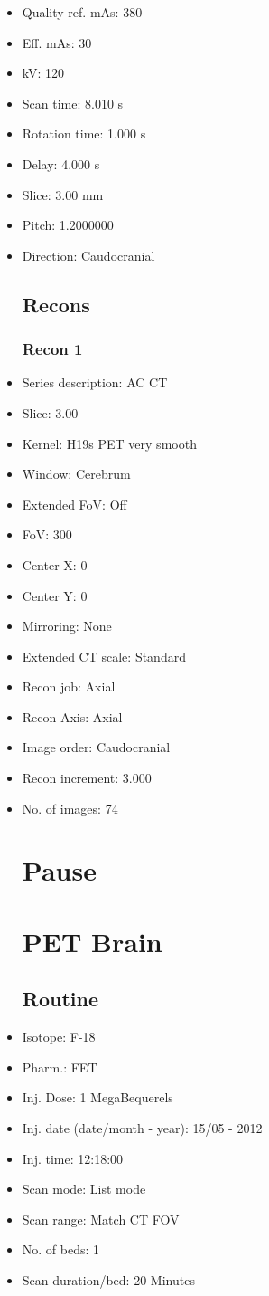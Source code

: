 \documentclass[12pt]{article}
\begin{document}
\begin{itemize}
\subsection{Scan}
\item Quality ref. mAs: 380\item Eff. mAs: 30\item kV: 120\item Scan time: 8.010 s\item Rotation time: 1.000 s\item Delay: 4.000 s\item Slice: 3.00 mm\item Pitch: 1.2000000\item Direction: Caudocranial\subsection{Recons}

\subsubsection{Recon 1}
\item Series description: AC CT
\item Slice: 3.00
\item Kernel: H19s PET very smooth
\item Window: Cerebrum
\item Extended FoV: Off
\item FoV: 300
\item Center X: 0
\item Center Y: 0
\item Mirroring: None
\item Extended CT scale: Standard
\item Recon job: Axial
\item Recon Axis: Axial
\item Image order: Caudocranial
\item Recon increment: 3.000
\item No. of images: 74
\section{Pause}
\section{PET Brain}\subsection{Routine}
\item Isotope: F-18
\item Pharm.: FET
\item Inj. Dose: 1 MegaBequerels
\item Inj. date (date/month - year): 15/05 - 2012
\item Inj. time: 12:18:00
\item Scan mode: List mode
\item Scan range: Match CT FOV
\item No. of beds: 1
\item Scan duration/bed: 20 Minutes

\end{itemize}
\end{document}
